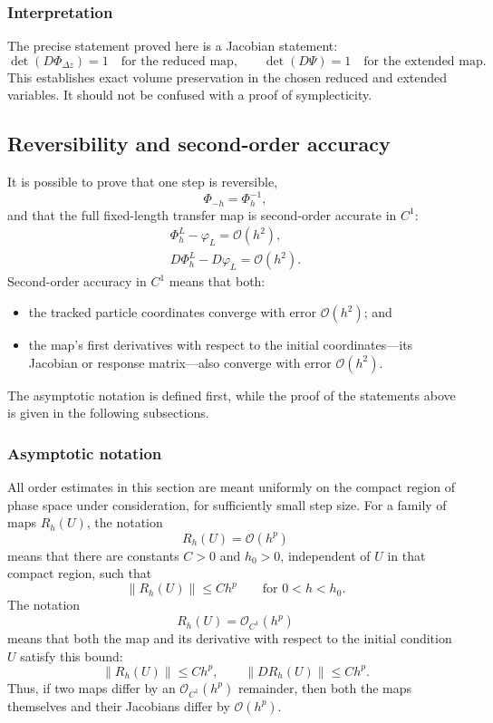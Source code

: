 \subsubsection{Interpretation}
The precise statement proved here is a Jacobian statement:
\[
\det(D\Phi_{\Delta z})=1
\quad\text{for the reduced map,}\qquad
\det(D\Psi)=1
\quad\text{for the extended map.}
\]
This establishes exact volume preservation in the chosen reduced and extended
variables.
It should not be confused with a proof of symplecticity.

\subsection{Reversibility and second-order accuracy}
\label{boris:sec:accuracy}

It is possible to prove that one step is reversible,
\[
\boxed{\Phi_{-h}=\Phi_h^{-1}},
\]
and that the full fixed-length transfer map is second-order accurate in
\(C^1\):
\[
\boxed{
\begin{gathered}
\Phi_h^L-\varphi_L=\mathcal O(h^2),\\
D\Phi_h^L-D\varphi_L=\mathcal O(h^2).
\end{gathered}
}
\]
Second-order accuracy in \(C^1\) means that both:
\begin{itemize}
\item the tracked particle coordinates converge with error
\(\mathcal O(h^2)\); and
\item the map's first derivatives with respect to the initial coordinates---its
Jacobian or response matrix---also converge with error \(\mathcal O(h^2)\).
\end{itemize}

The asymptotic notation is defined first, while the proof of the statements
above is given in the following subsections.

\subsubsection{Asymptotic notation}
All order estimates in this section are meant uniformly on the compact region
of phase space under consideration, for sufficiently small step size.
For a family of maps \(R_h(U)\), the notation
\[
R_h(U)=\mathcal O(h^p)
\]
means that there are constants \(C>0\) and \(h_0>0\), independent of \(U\) in
that compact region, such that
\[
\|R_h(U)\|\le C h^p
\qquad
\text{for } 0<h<h_0.
\]
The notation
\[
R_h(U)=\mathcal O_{C^1}(h^p)
\]
means that both the map and its derivative with respect to the initial
condition \(U\) satisfy this bound:
\[
\|R_h(U)\|\le C h^p,
\qquad
\|DR_h(U)\|\le C h^p.
\]
Thus, if two maps differ by an \(\mathcal O_{C^1}(h^p)\) remainder, then both
the maps themselves and their Jacobians differ by \(\mathcal O(h^p)\).

